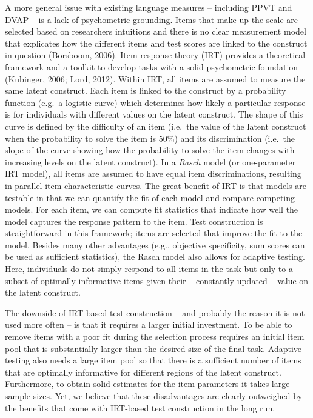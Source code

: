 \documentclass[
  man,floatsintext]{apa6}
\begin{document}
A more general issue with existing language measures -- including PPVT and DVAP -- is a lack of psychometric grounding. Items that make up the scale are selected based on researchers intuitions and there is no clear measurement model that explicates how the different items and test scores are linked to the construct in question (Borsboom, 2006). Item response theory (IRT) provides a theoretical framework and a toolkit to develop tasks with a solid psychometric foundation (Kubinger, 2006; Lord, 2012). Within IRT, all items are assumed to measure the same latent construct. Each item is linked to the construct by a probability function (e.g.~a logistic curve) which determines how likely a particular response is for individuals with different values on the latent construct. The shape of this curve is defined by the difficulty of an item (i.e.~the value of the latent construct when the probability to solve the item is 50\%) and its discrimination (i.e.~the slope of the curve showing how the probability to solve the item changes with increasing levels on the latent construct). In a \emph{Rasch} model (or one-parameter IRT model), all items are assumed to have equal item discriminations, resulting in parallel item characteristic curves. The great benefit of IRT is that models are testable in that we can quantify the fit of each model and compare competing models. For each item, we can compute fit statistics that indicate how well the model captures the response pattern to the item. Test construction is straightforward in this framework; items are selected that improve the fit to the model. Besides many other advantages (e.g., objective specificity, sum scores can be used as sufficient statistics), the Rasch model also allows for adaptive testing. Here, individuals do not simply respond to all items in the task but only to a subset of optimally informative items given their -- constantly updated -- value on the latent construct.

The downside of IRT-based test construction -- and probably the reason it is not used more often -- is that it requires a larger initial investment. To be able to remove items with a poor fit during the selection process requires an initial item pool that is substantially larger than the desired size of the final task. Adaptive testing also needs a large item pool so that there is a sufficient number of items that are optimally informative for different regions of the latent construct. Furthermore, to obtain solid estimates for the item parameters it takes large sample sizes. Yet, we believe that these disadvantages are clearly outweighed by the benefits that come with IRT-based test construction in the long run.
\end{document}
